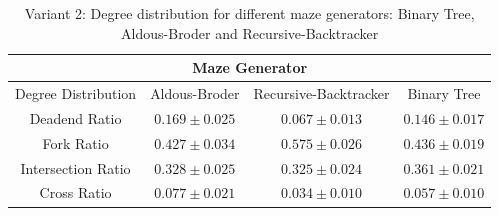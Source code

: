      \begin{table}[!h]
        \begin{center} 
            \caption{Variant 2: Degree distribution for different maze generators: Binary Tree, Aldous-Broder and Recursive-Backtracker} 
        \begin{tabular}{ c c c c} 
        \multicolumn{4}{c}{Maze Generator} \\
        \hline
    Degree Distribution&Aldous-Broder&Recursive-Backtracker&Binary Tree\\
        \hline
    Deadend Ratio&$0.169\pm 0.025$&$0.067\pm 0.013$&$0.146\pm 0.017$\\    
        \hline
    Fork Ratio&$0.427\pm 0.034$&$0.575\pm 0.026$&$0.436\pm 0.019$\\ 
        \hline
    Intersection Ratio&$0.328\pm 0.025$&$0.325\pm 0.024$&$0.361\pm 0.021$\\   
        \hline
    Cross Ratio&$0.077\pm 0.021$&$0.034\pm 0.010$&$0.057\pm 0.010$\\   
        \hline   
         \end{tabular} 
        \end{center}
         \end{table}
